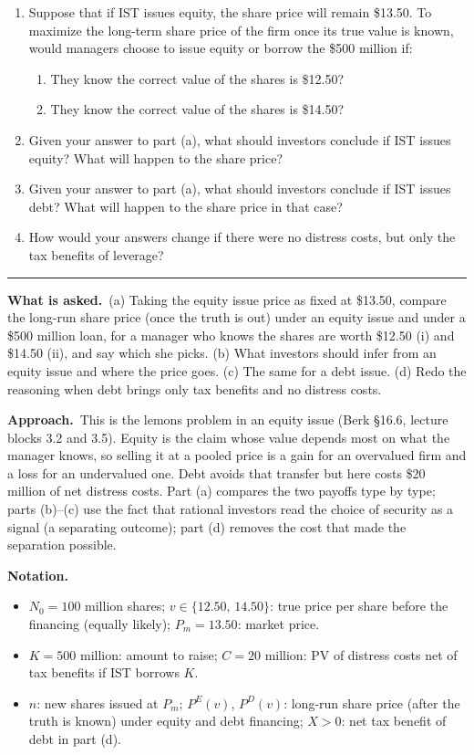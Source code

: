 \documentclass[11pt,a4paper]{article}
\newcommand{\notation}{\par\noindent\textbf{Notation.}}
\newcommand{\asked}{\par\medskip\noindent\textbf{What is asked.}~}
\newcommand{\approach}{\par\smallskip\noindent\textbf{Approach.}~}
\providecommand{\tightlist}{\setlength{\itemsep}{0pt}\setlength{\parskip}{0pt}}
\newcommand{\stmtend}{\par\endgroup\nopagebreak\noindent\rule{\linewidth}{0.4pt}\par\medskip}
\begin{document}
\begin{enumerate}
\def\labelenumi{\alph{enumi}.}
\item
  Suppose that if IST issues equity, the share price will remain \$13.50. To maximize the long-term
  share price of the firm once its true value is known, would managers choose to issue equity or
  borrow the \$500 million if:

  \begin{enumerate}
  \def\labelenumii{\roman{enumii}.}
  \tightlist
  \item
    They know the correct value of the shares is \$12.50?
  \item
    They know the correct value of the shares is \$14.50?
  \end{enumerate}
\item
  Given your answer to part (a), what should investors conclude if IST issues equity? What will
  happen to the share price?
\item
  Given your answer to part (a), what should investors conclude if IST issues debt? What will happen
  to the share price in that case?
\item
  How would your answers change if there were no distress costs, but only the tax benefits of
  leverage?
\end{enumerate}
\stmtend

\asked (a) Taking the equity issue price as fixed at \$13.50, compare the long-run share price (once the truth is out) under an equity issue and under a \$500 million loan, for a manager who knows the shares are worth \$12.50 (i) and \$14.50 (ii), and say which she picks. (b) What investors should infer from an equity issue and where the price goes. (c) The same for a debt issue. (d) Redo the reasoning when debt brings only tax benefits and no distress costs.

\approach This is the lemons problem in an equity issue (Berk \S16.6, lecture blocks 3.2 and 3.5). Equity is the claim whose value depends most on what the manager knows, so selling it at a pooled price is a gain for an overvalued firm and a loss for an undervalued one. Debt avoids that transfer but here costs \$20 million of net distress costs. Part (a) compares the two payoffs type by type; parts (b)--(c) use the fact that rational investors read the choice of security as a signal (a separating outcome); part (d) removes the cost that made the separation possible.

\notation
\begin{itemize}
  \item $N_0=100$ million shares; $v\in\{12.50,\,14.50\}$: true price per share before the financing (equally likely); $P_m=13.50$: market price.
  \item $K=500$ million: amount to raise; $C=20$ million: PV of distress costs net of tax benefits if IST borrows $K$.
  \item $n$: new shares issued at $P_m$; $P^E(v)$, $P^D(v)$: long-run share price (after the truth is known) under equity and debt financing; $X>0$: net tax benefit of debt in part (d).
\end{itemize}
\end{document}
